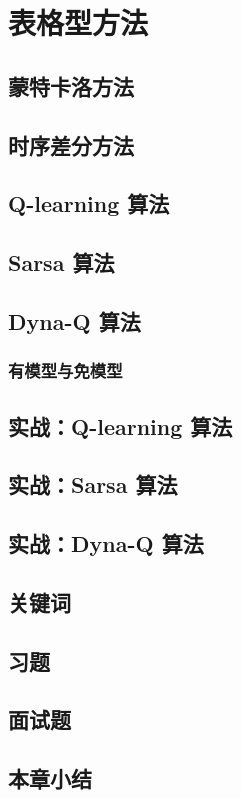 \section{表格型方法}
\subsection{蒙特卡洛方法}
\subsection{时序差分方法}
\subsection{ Q-learning 算法}
\subsection{ Sarsa 算法}
\subsection{ Dyna-Q 算法}
\subsubsection{有模型与免模型}
\subsection{实战：Q-learning 算法}
\subsection{实战：Sarsa 算法}
\subsection{实战：Dyna-Q 算法}
\subsection{关键词}
\subsection{习题}
\subsection{面试题}
\subsection{本章小结}